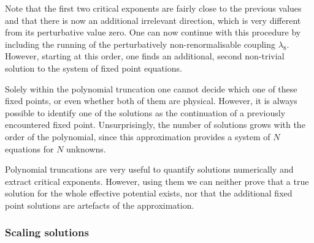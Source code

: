 \documentclass[11pt]{book}
\numberwithin{equation}{chapter}
\begin{document}
Note that the first two critical exponents are fairly close to the previous values
and that there is now an additional irrelevant direction, which is very different
from its perturbative value zero. One can now continue with this procedure by including
the running of the perturbatively non-renormalisable coupling $\lambda_8$. However,
starting at this order, one finds an additional, second non-trivial solution to the system
of fixed point equations.

Solely within the polynomial truncation one cannot decide which one of these fixed points,
or even whether both of them are physical. However, it is always possible to identify
one of the solutions as the continuation of a previously encountered fixed point.
Unsurprisingly, the number of solutions grows with the order of the polynomial, since
this approximation provides a system of $N$ equations for $N$ unknowns.

Polynomial truncations are very useful to quantify solutions numerically and extract
critical exponents. However, using them we can neither prove that a true solution for
the whole effective potential exists, nor that the additional fixed point solutions
are artefacts of the approximation.

\subsubsection{Scaling solutions}
\end{document}
